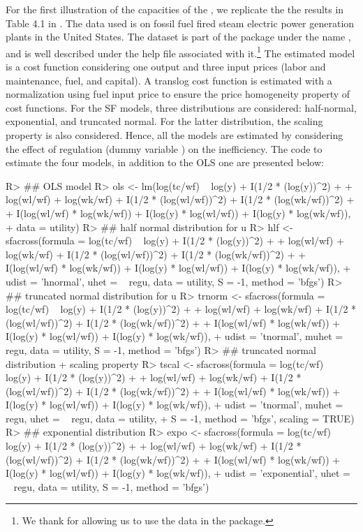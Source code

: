 \documentclass[nojss]{jss}
\begin{document}
For the first illustration of the capacities of the , we replicate the 
the results in Table 4.1 in \cite[p.~119]{kum14}. The data used is on fossil fuel
fired steam electric power generation plants in the United States. The dataset
is part of the package under the name , and is well described under
the help file associated with it.\footnote{We thank \cite{kum14} for allowing
us to use the data in the package.} The estimated model is a cost function 
considering one output and three input prices (labor and maintenance, fuel, 
and capital). A translog cost function is estimated with a normalization using
fuel input price to ensure the price homogeneity property of cost functions. For
the SF models, three distributions are considered: half-normal, exponential, and
truncated normal. For the latter distribution, the scaling property is also 
considered. Hence, all the models are estimated by considering the effect of
regulation (dummy variable ) on the inefficiency. The code to estimate
the four models, in addition to the OLS one are presented below:

\begin{Schunk}
\begin{Sinput}
R> ## OLS model
R> ols <- lm(log(tc/wf) ~ log(y) + I(1/2 * (log(y))^2) +
+   log(wl/wf) + log(wk/wf) + I(1/2 * (log(wl/wf))^2) + I(1/2 * (log(wk/wf))^2) +
+   I(log(wl/wf) * log(wk/wf)) + I(log(y) * log(wl/wf)) + I(log(y) * log(wk/wf)), 
+   data = utility)
R> ## half normal distribution for u
R> hlf <- sfacross(formula = log(tc/wf) ~ log(y) + I(1/2 * (log(y))^2) +
+   log(wl/wf) + log(wk/wf) + I(1/2 * (log(wl/wf))^2) + I(1/2 * (log(wk/wf))^2) +
+   I(log(wl/wf) * log(wk/wf)) + I(log(y) * log(wl/wf)) + I(log(y) * log(wk/wf)),
+   udist = 'hnormal', uhet = ~ regu, data = utility, S = -1, method = 'bfgs')
R> ## truncated normal distribution for u
R> trnorm <- sfacross(formula = log(tc/wf) ~ log(y) + I(1/2 * (log(y))^2) +
+   log(wl/wf) + log(wk/wf) + I(1/2 * (log(wl/wf))^2) + I(1/2 * (log(wk/wf))^2) +
+   I(log(wl/wf) * log(wk/wf)) + I(log(y) * log(wl/wf)) + I(log(y) * log(wk/wf)),
+   udist = 'tnormal', muhet = ~ regu, data = utility, S = -1, method = 'bfgs')
R> ## truncated normal distribution + scaling property
R> tscal <- sfacross(formula = log(tc/wf) ~ log(y) + I(1/2 * (log(y))^2) +
+   log(wl/wf) + log(wk/wf) + I(1/2 * (log(wl/wf))^2) + I(1/2 * (log(wk/wf))^2) +
+   I(log(wl/wf) * log(wk/wf)) + I(log(y) * log(wl/wf)) + I(log(y) * log(wk/wf)),
+   udist = 'tnormal', muhet = ~ regu, uhet = ~ regu, data = utility, 
+   S = -1, method = 'bfgs', scaling = TRUE)
R> ## exponential distribution
R> expo <- sfacross(formula = log(tc/wf) ~ log(y) + I(1/2 * (log(y))^2) +
+   log(wl/wf) + log(wk/wf) + I(1/2 * (log(wl/wf))^2) + I(1/2 * (log(wk/wf))^2) +
+   I(log(wl/wf) * log(wk/wf)) + I(log(y) * log(wl/wf)) + I(log(y) * log(wk/wf)),
+   udist = 'exponential', uhet = ~ regu, data = utility, S = -1, method = 'bfgs')
\end{Sinput}
\end{Schunk}
\end{document}
